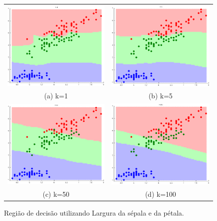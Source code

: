 \documentclass[
	article,			%
	11pt,				%
	oneside,			%
	a4paper,			%
	english,			%
	brazil,				%
	]{abntex2}
\begin{document}
\begin{figure}
	\centering
	\begin{tabular}{cc}
	  \includegraphics[width=70mm]{figuras/sepLVsPetL/decRegK1.eps} &  
	  \includegraphics[width=70mm]{figuras/sepLVsPetL/decRegK5.eps}
	  \\
	(a) k=1 & (b) k=5 \\[6pt] 
	 \includegraphics[width=70mm]{figuras/sepLVsPetL/decRegK50.eps} &  
	 \includegraphics[width=70mm]{figuras/sepLVsPetL/decRegK100.eps} \\
	(c) k=50 & (d) k=100 \\[6pt] 

	\end{tabular}
	\label{fig:decisionRegionSepL_PetL}
	\caption{Região de decisão utilizando Largura da sépala e da pétala.}
\end{figure}
\end{document}
